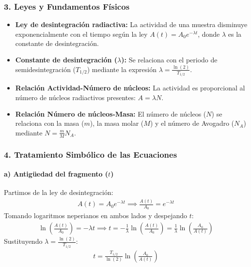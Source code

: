 \subsubsection*{3. Leyes y Fundamentos Físicos}
\begin{itemize}
    \item \textbf{Ley de desintegración radiactiva:} La actividad de una muestra disminuye exponencialmente con el tiempo según la ley $A(t) = A_0 e^{-\lambda t}$, donde $\lambda$ es la constante de desintegración.
    \item \textbf{Constante de desintegración ($\lambda$):} Se relaciona con el periodo de semidesintegración ($T_{1/2}$) mediante la expresión $\lambda = \frac{\ln(2)}{T_{1/2}}$.
    \item \textbf{Relación Actividad-Número de núcleos:} La actividad es proporcional al número de núcleos radiactivos presentes: $A = \lambda N$.
    \item \textbf{Relación Número de núcleos-Masa:} El número de núcleos ($N$) se relaciona con la masa ($m$), la masa molar ($M$) y el número de Avogadro ($N_A$) mediante $N = \frac{m}{M} N_A$.
\end{itemize}

\subsubsection*{4. Tratamiento Simbólico de las Ecuaciones}
\paragraph{a) Antigüedad del fragmento ($t$)}
Partimos de la ley de desintegración:
\begin{gather}
    A(t) = A_0 e^{-\lambda t} \implies \frac{A(t)}{A_0} = e^{-\lambda t}
\end{gather}
Tomando logaritmos neperianos en ambos lados y despejando $t$:
\begin{gather}
    \ln\left(\frac{A(t)}{A_0}\right) = -\lambda t \implies t = -\frac{1}{\lambda} \ln\left(\frac{A(t)}{A_0}\right) = \frac{1}{\lambda} \ln\left(\frac{A_0}{A(t)}\right)
\end{gather}
Sustituyendo $\lambda = \frac{\ln(2)}{T_{1/2}}$:
\begin{gather}
    t = \frac{T_{1/2}}{\ln(2)} \ln\left(\frac{A_0}{A(t)}\right)
\end{gather}

